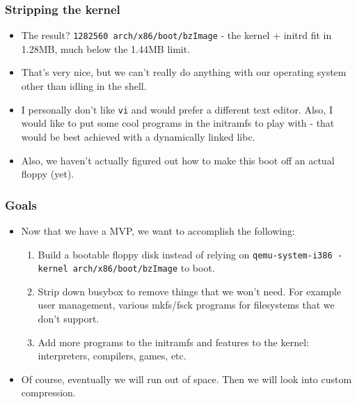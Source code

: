 \documentclass{beamer}
\begin{document}
\begin{frame}[t,fragile]
\frametitle{Stripping the kernel}
\begin{itemize}
  \item The result? \verb|1282560 arch/x86/boot/bzImage| - the kernel + initrd fit in 1.28MB, much below the 1.44MB limit.
  \item That's very nice, but we can't really do anything with our operating system other than idling in the shell.
  \item I personally don't like \verb|vi| and would prefer a different text editor. Also, I would like to put some cool programs in the initramfs to play with - that would be best achieved with a dynamically linked libc.
  \item Also, we haven't actually figured out how to make this boot off an actual floppy (yet).
\end{itemize}
\end{frame}

\begin{frame}[t,fragile]
\frametitle{Goals}
\begin{itemize}
  \item Now that we have a MVP, we want to accomplish the following:
  \begin{enumerate}
    \item Build a bootable floppy disk instead of relying on \verb|qemu-system-i386 -kernel arch/x86/boot/bzImage| to boot.
    \item Strip down busybox to remove things that we won't need. For example user management, various mkfs/fsck programs for filesystems that we don't support.
    \item Add more programs to the initramfs and features to the kernel: interpreters, compilers, games, etc.
  \end{enumerate}
  \item Of course, eventually we will run out of space. Then we will look into custom compression.
\end{itemize}
\end{frame}
\end{document}
